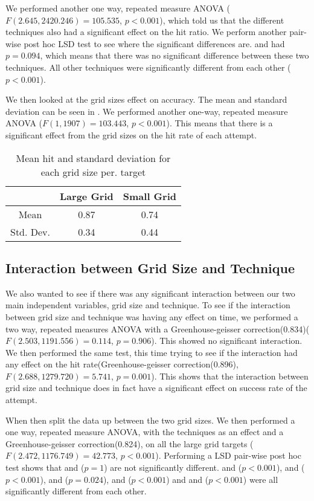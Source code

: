 We performed another one way, repeated measure ANOVA ($F(2.645,2420.246)=105.535$, $p<0.001$), which told us that the different techniques also had a significant effect on the hit ratio. We perform another pair-wise post hoc LSD test to see where the significant differences are. \pinch and \tilt had $p=0.094$, which means that there was no significant difference between these two techniques. All other techniques were significantly different from each other ($p<0.001$). 

We then looked at the grid sizes effect on accuracy. The mean and standard deviation can be seen in . We performed another one-way, repeated measure ANOVA ($F(1,1907)=103.443$, $p<0.001$). This means that there is a significant effect from the grid sizes on the hit rate of each attempt.

\begin{table}[H]
	\centering
	\begin{tabular}{|c|c|c|}
		\hline
		\rowcolor[HTML]{9B9B9B} 
		& \textbf{Large Grid} & \textbf{Small Grid} \\ \hline
		Mean & 0.87 & 0.74 \\ \hline
		Std. Dev. & 0.34 & 0.44 \\ \hline
		\end{tabular}
		\caption{Mean hit and standard deviation for each grid size per. target}
		\label{tab:meanHitSize}
\end{table}

\subsection{Interaction between Grid Size and Technique}
We also wanted to see if there was any significant interaction between our two main independent variables, grid size and technique. 
To see if the interaction between grid size and technique was having any effect on time, we performed a two way, repeated measures ANOVA with a Greenhouse-geisser correction(0.834)($F(2.503,1191.556)=0.114$, $p=0.906$). This showed no significant interaction. We then performed the same test, this time trying to see if the interaction had any effect on the hit rate(Greenhouse-geisser correction(0.896), $F(2.688,1279.720)=5.741$, $p=0.001$). This shows that the interaction between grid size and technique does in fact have a significant effect on success rate of the attempt. 

When then split the data up between the two grid sizes. We then performed a one way, repeated measure ANOVA, with the techniques as an effect and a Greenhouse-geisser correction(0.824), on all the large grid targets ($F(2.472, 1176.749)=42.773$, $p<0.001$).
Performing a LSD pair-wise post hoc test shows that \pinch and \tilt ($p=1$) are not significantly different. \pinch and \swipe ($p<0.001$), \pinch and \throw ($p<0.001$), \swipe and \throw ($p=0.024$),  \swipe and \tilt ($p<0.001$) and \tilt and \throw ($p<0.001$) were all significantly different from each other.

